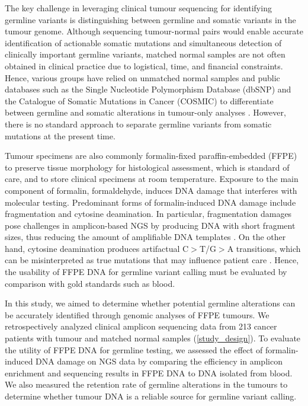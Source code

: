 \documentclass{bmcart}
\begin{document}
The key challenge in leveraging clinical tumour sequencing for identifying germline variants is distinguishing between germline and somatic variants in the tumour genome. Although sequencing tumour-normal pairs would enable accurate identification of actionable somatic mutations and simultaneous detection of clinically important germline variants, matched normal samples are not often obtained in clinical practice due to logistical, time, and financial constraints. Hence, various groups have relied on unmatched normal samples and public databases such as the Single Nucleotide Polymorphism Database (dbSNP) and the Catalogue of Somatic Mutations in Cancer (COSMIC) to differentiate between germline and somatic alterations in tumour-only analyses \cite{Hiltemann2015, Jones2015a}. However, there is no standard approach to separate germline variants from somatic mutations at the present time.

Tumour specimens are also commonly formalin-fixed paraffin-embedded (FFPE) to preserve tissue morphology for histological assessment, which is standard of care, and to store clinical specimens at room temperature. Exposure to the main component of formalin, formaldehyde, induces DNA damage that interferes with molecular testing. Predominant forms of formalin-induced DNA damage include fragmentation and cytosine deamination. In particular, fragmentation damages pose challenges in amplicon-based NGS by producing DNA with short fragment sizes, thus reducing the amount of amplifiable DNA templates \cite{Shi2002, Didelot2013, Wong2013}. On the other hand, cytosine deamination produces artifactual C$>$T/G$>$A transitions, which can be misinterpreted as true mutations that may influence patient care \cite{Do2015a, Wong2014}. Hence, the usability of FFPE DNA for germline variant calling must be evaluated by comparison with gold standards such as blood.

In this study, we aimed to determine whether potential germline alterations can be accurately identified through genomic analyses of FFPE tumours. We retrospectively analyzed clinical amplicon sequencing data from 213 cancer patients with tumour and matched normal samples (\autoref{study_design}). To evaluate the utility of FFPE DNA for germline testing, we assessed the effect of formalin-induced DNA damage on NGS data by comparing the efficiency in amplicon enrichment and sequencing results in FFPE DNA to DNA isolated from blood. We also measured the retention rate of germline alterations in the tumours to determine whether tumour DNA is a reliable source for germline variant calling.
\end{document}
